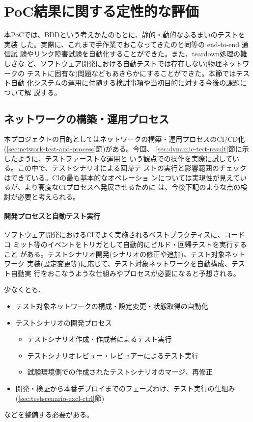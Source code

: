 \section{PoC結果に関する定性的な評価}

本PoCでは、BDDという考えかたのもとに、静的・動的なふるまいのテストを実装
した。実際に、これまで手作業でおこなってきたのと同等の end-to-end 通信試
験やリンク障害試験を自動化することができた。また、teardown処理の難しさな
ど、ソフトウェア開発における自動テストでは存在しない(物理ネットワークの
テストに固有な)問題などもあきらかにすることができた。本節ではテスト自動
化システムの運用に付随する検討事項や当初目的に対する今後の課題について解
説する。

  \subsection{ネットワークの構築・運用プロセス}

本プロジェクトの目的としてはネットワークの構築・運用プロセスのCI/CD化
(\ref{sec:network-test-and-process}節)がある。今回、
\ref{sec:dynamic-test-result}節に示したように、テストファーストな運用と
いう観点での操作を実際に試している。この中で、テストシナリオによる回帰テ
ストの実行と影響範囲のチェックはできている。CIの最も基本的なオペレーショ
ンについては実現性が見えているが、より高度なCIプロセスへ発展させるために
は、今後下記のような点の検討が必要と考えられる。

    \paragraph{開発プロセスと自動テスト実行}
ソフトウェア開発におけるCIでよく実施されるベストプラクティスに、コードコ
ミット等のイベントをトリガとして自動的にビルド・回帰テストを実行すること
がある。テストシナリオ開発(シナリオの修正や追加)、テスト対象ネットワーク
実装(設定変更等)に応じて、テスト対象ネットワークを自動構成、テスト自動実
行をおこなうような仕組みやプロセスが必要になると予想される。

少なくとも、
\begin{itemize}
 \item テスト対象ネットワークの構成・設定変更・状態取得の自動化
 \item テストシナリオの開発プロセス
       \begin{itemize}
        \item テストシナリオ作成・作成者によるテスト実行
        \item テストシナリオレビュー・レビュアーによるテスト実行
        \item 試験環境側での作成されたテストシナリオのマージ、再修正
       \end{itemize}
 \item 開発・検証から本番デプロイまでのフェーズわけ、テスト実行の仕組み
       (\ref{sec:testscenario-excl-ctrl}節)
\end{itemize}
などを整備する必要がある。

